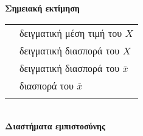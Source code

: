 \documentclass[12pt]{article}
\begin{document}
\newpage

\renewcommand{\arraystretch}{2.5}


\textbf{Σημειακή εκτίμηση}

\begin{tabular}{|l|l|}
\hl
     $\bar{x} = \frac{1}{n} \sum_{i=1}^nx_i$ & δειγματική μέση τιμή του $X$ \\
\hl

    $s^2= \frac{1}{n-1}\sum_{i=1}^n(x_i-\bar{x})^2=\frac{1}{n-1}(\sum_{i=1}^nx_i^2-n\bar{x}^2)$
     & δειγματική διασπορά του $X$ \\
\hl

    $s_{\bar{x}}^2 = s^2/n$ & δειγματική διασπορά του $\bar{x}$ \\
\hl

    $σ_{\bar{x}}^2=σ^2/n$ & διασπορά του $\bar{x}$\\
\hl
   
\end{tabular}\\

\textbf{Διαστήματα εμπιστοσύνης}
\end{document}
